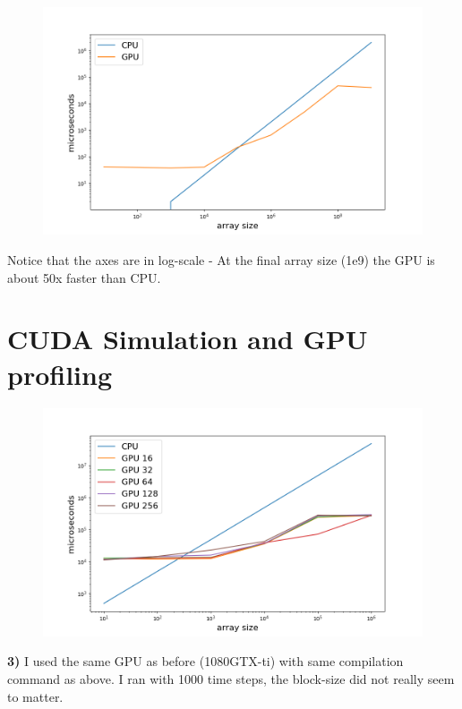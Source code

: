 \documentclass{article}
\begin{document}
\begin{figure}[H]
  \centering
  \includegraphics[width=0.95\linewidth]{ex_2/saxpy-cpu-vs-gpu.png}
  \label{fig:}
\end{figure}

Notice that the axes are in log-scale - At the final array size (1e9) the GPU is about 50x faster than CPU.

\section*{CUDA Simulation and GPU profiling}%
\label{sec:cuda_simulation_and_gpu_profiling}

\begin{figure}[H]
  \centering
  \includegraphics[width=0.95\linewidth]{ex_3/simulation-cpu-vs-gpu.png}
  \label{fig:}
\end{figure}


\textbf{3)}
I used the same GPU as before (1080GTX-ti) with same compilation command as above. I ran with 1000 time steps, the block-size did not really seem to matter.
\end{document}
